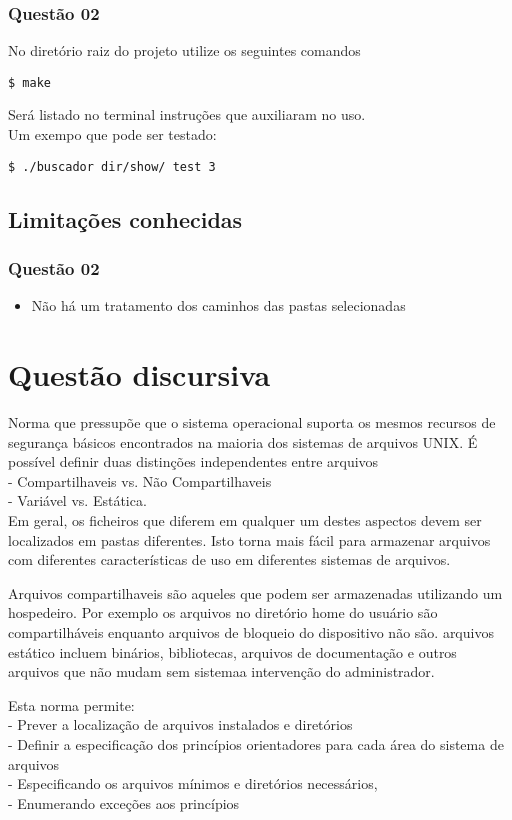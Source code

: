 \documentclass[11pt,a4paper]{article}
\begin{document}
\subsubsection{Questão 02}
No diretório raiz do projeto utilize os seguintes comandos
\begin{verbatim}
$ make
\end{verbatim}
Será listado no terminal instruções que auxiliaram no uso.\\
Um exempo que pode ser testado:
\begin{verbatim}
$ ./buscador dir/show/ test 3
\end{verbatim}

\subsection{Limitações conhecidas}
\subsubsection{Questão 02}
\begin{itemize}
  \item Não há um tratamento dos caminhos das pastas selecionadas
\end{itemize}

\section{Questão discursiva}
Norma que pressupõe
que o sistema operacional suporta os mesmos
recursos de segurança básicos encontrados na maioria dos sistemas de arquivos
UNIX. É possível definir duas distinções independentes entre arquivos\\
 - Compartilhaveis vs. Não Compartilhaveis \\
 - Variável vs. Estática. \\

Em geral, os ficheiros que diferem em qualquer um destes aspectos devem ser
localizados em pastas diferentes. Isto torna mais fácil
para armazenar arquivos com diferentes características de uso em diferentes
sistemas de arquivos.

Arquivos compartilhaveis são aqueles que podem ser armazenadas utilizando
um hospedeiro. Por exemplo os arquivos no diretório
home do usuário são compartilháveis enquanto arquivos de bloqueio do dispositivo não são.
arquivos estático incluem binários, bibliotecas, arquivos de documentação e
outros arquivos que não mudam sem sistemaa intervenção do administrador.

Esta norma permite:\\
- Prever a localização de arquivos instalados e diretórios \\
- Definir a especificação dos princípios orientadores para cada área do sistema de arquivos\\
- Especificando os arquivos mínimos e diretórios necessários,\\
- Enumerando exceções aos princípios
\end{document}
